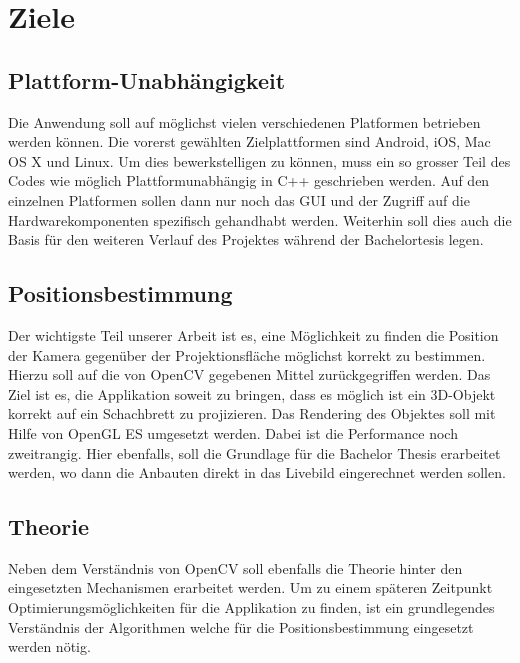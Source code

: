 \documentclass[main.tex]{subfiles}
\begin{document}
\section{Ziele}

\subsection{Plattform-Unabhängigkeit}
Die Anwendung soll auf möglichst vielen verschiedenen Platformen betrieben werden können. Die vorerst gewählten Zielplattformen sind Android, iOS, Mac OS X und Linux. Um dies bewerkstelligen zu können, muss ein so grosser Teil des Codes wie möglich Plattformunabhängig in C++ geschrieben werden. Auf den einzelnen Platformen sollen dann nur noch das GUI und der Zugriff auf die Hardwarekomponenten spezifisch gehandhabt werden. Weiterhin soll dies auch die Basis für den weiteren Verlauf des Projektes während der Bachelortesis legen.

\subsection{Positionsbestimmung}
Der wichtigste Teil unserer Arbeit ist es, eine Möglichkeit zu finden die Position der Kamera gegenüber der Projektionsfläche möglichst korrekt zu bestimmen. Hierzu soll auf die von OpenCV gegebenen Mittel zurückgegriffen werden. Das Ziel ist es, die Applikation soweit zu bringen, dass es möglich ist ein 3D-Objekt korrekt auf ein Schachbrett zu projizieren. Das Rendering des Objektes soll mit Hilfe von OpenGL ES umgesetzt werden. Dabei ist die Performance noch zweitrangig. Hier ebenfalls, soll die Grundlage für die Bachelor Thesis erarbeitet werden, wo dann die Anbauten direkt in das Livebild eingerechnet werden sollen.

\subsection{Theorie}
Neben dem Verständnis von OpenCV soll ebenfalls die Theorie hinter den eingesetzten Mechanismen erarbeitet werden. Um zu einem späteren Zeitpunkt Optimierungsmöglichkeiten für die Applikation zu finden, ist ein grundlegendes Verständnis der Algorithmen welche für die Positionsbestimmung eingesetzt werden nötig.
\end{document}
